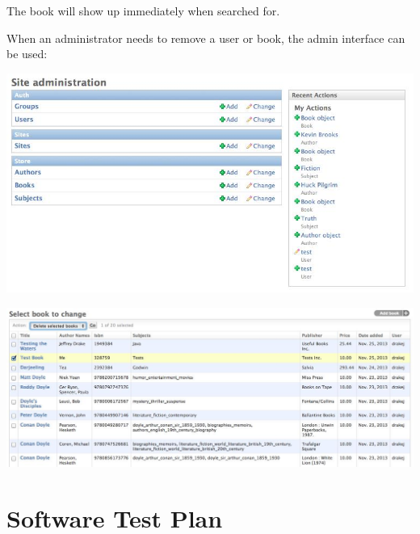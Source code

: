 \documentclass[11pt]{article}
\begin{document}
\vspace{0.1in}

The book will show up immediately when searched for.

When an administrator needs to remove a user or book, the admin
interface can be used:

\vspace{0.2in}

\centerline{\includegraphics[scale=0.45]{./images/admin-panel.jpg}}

\vspace{0.1in}

\vspace{0.2in}

\centerline{\includegraphics[scale=0.35]{./images/admin-item-list.jpg}}

\vspace{0.1in}



\newpage
\section{Software Test Plan}
\label{sec:software-test-plan}
\end{document}
